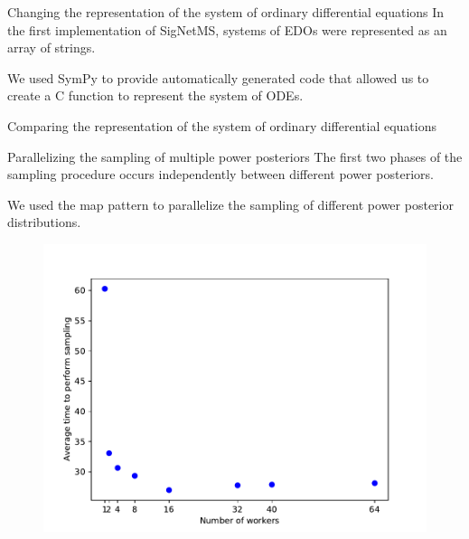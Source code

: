 \documentclass{beamer}
\begin{document}
\begin{frame}{Changing the representation of the system of ordinary
differential equations}
In the first implementation of SigNetMS, systems of EDOs were
represented as an array of strings. 

\pause
We used SymPy to provide automatically generated code that allowed us to
create a C function to represent the system of ODEs.
\end{frame}

\begin{frame}{Comparing the representation of the system of ordinary
differential equations}
\begin{table}[]
\centering
{}
\end{table}
\end{frame}

\begin{frame}{Parallelizing the sampling of multiple power posteriors}
The first two phases of the sampling procedure occurs independently
between different power posteriors. \pause

We used the map pattern to parallelize the sampling of different power
posterior distributions. \pause

\begin{figure}[t!]
\begin{center}
\includegraphics[width=.65\textwidth]{optimizations/workers_experiment.pdf}
\end{center}
\end{figure}
\end{frame}
\end{document}
